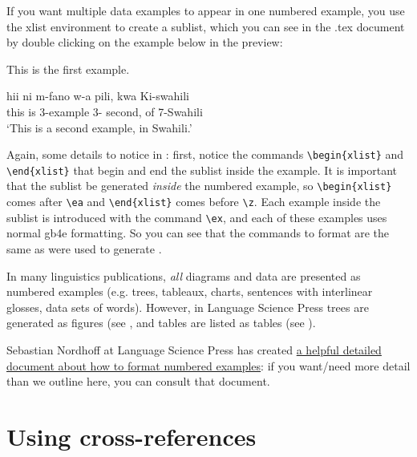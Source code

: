\documentclass[output=paper,colorlinks,citecolor=brown,
]{langscibook}
\begin{document}
If you want multiple data examples to appear in one numbered example, you use the xlist environment to create a sublist, which you can see in the .tex document by double clicking on the example below in the preview: 

\ea \label{ex:diercks:XlistExample}
\begin{xlist}

\ex This is the first example. 

\ex \label{ex:diercks:SwahiliXlist}
\gll hii ni m-fano w-a pili, kwa Ki-swahili \\
this is 3-example 3-\Assoc{} second, of 7-Swahili \\
\glt `This is a second example, in Swahili.' 

\end{xlist}

\z 

\noindent Again, some details to notice in : first, notice the commands \verb|\begin{xlist}| and \verb|\end{xlist}| that begin and end the sublist inside the example. It is important that the sublist be generated \textit{inside} the numbered example, so \verb|\begin{xlist}| comes after \verb|\ea| and \verb|\end{xlist}| comes before \verb|\z|. Each example inside the sublist is introduced with the command \verb|\ex|, and each of these examples uses normal gb4e formatting. So you can see that the commands to format  are the same as were used to generate .

In many linguistics publications, \textit{all} diagrams and data are presented as numbered examples (e.g. trees, tableaux, charts, sentences with interlinear glosses, data sets of words). However, in Language Science Press trees are generated as figures (see , and tables are listed as tables (see ). 

Sebastian Nordhoff at Language Science Press has created \href{https://github.com/langsci/guidelines/blob/master/packages/langsci-gb4e/langsci-gb4.pdf}{a helpful detailed document about how to format numbered examples}: if you want/need more detail than we outline here, you can consult that document.

\section{Using cross-references} \label{sec:diercks:CrossReferences}
\end{document}
